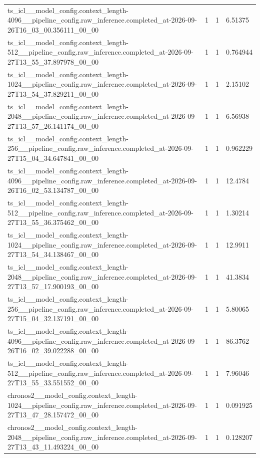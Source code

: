 \begin{tabular}{llll}
ts\_icl\_\_model\_config.context\_length-4096\_\_pipeline\_config.raw\_inference.completed\_at-2026-09-26T16\_03\_00.356111\_00\_00 & 1 & 1 & 6.51375 \\
ts\_icl\_\_model\_config.context\_length-512\_\_pipeline\_config.raw\_inference.completed\_at-2026-09-27T13\_55\_37.897978\_00\_00 & 1 & 1 & 0.764944 \\
ts\_icl\_\_model\_config.context\_length-1024\_\_pipeline\_config.raw\_inference.completed\_at-2026-09-27T13\_54\_37.829211\_00\_00 & 1 & 1 & 2.15102 \\
ts\_icl\_\_model\_config.context\_length-2048\_\_pipeline\_config.raw\_inference.completed\_at-2026-09-27T13\_57\_26.141174\_00\_00 & 1 & 1 & 6.56938 \\
ts\_icl\_\_model\_config.context\_length-256\_\_pipeline\_config.raw\_inference.completed\_at-2026-09-27T15\_04\_34.647841\_00\_00 & 1 & 1 & 0.962229 \\
ts\_icl\_\_model\_config.context\_length-4096\_\_pipeline\_config.raw\_inference.completed\_at-2026-09-26T16\_02\_53.134787\_00\_00 & 1 & 1 & 12.4784 \\
ts\_icl\_\_model\_config.context\_length-512\_\_pipeline\_config.raw\_inference.completed\_at-2026-09-27T13\_55\_36.375462\_00\_00 & 1 & 1 & 1.30214 \\
ts\_icl\_\_model\_config.context\_length-1024\_\_pipeline\_config.raw\_inference.completed\_at-2026-09-27T13\_54\_34.138467\_00\_00 & 1 & 1 & 12.9911 \\
ts\_icl\_\_model\_config.context\_length-2048\_\_pipeline\_config.raw\_inference.completed\_at-2026-09-27T13\_57\_17.900193\_00\_00 & 1 & 1 & 41.3834 \\
ts\_icl\_\_model\_config.context\_length-256\_\_pipeline\_config.raw\_inference.completed\_at-2026-09-27T15\_04\_32.137191\_00\_00 & 1 & 1 & 5.80065 \\
ts\_icl\_\_model\_config.context\_length-4096\_\_pipeline\_config.raw\_inference.completed\_at-2026-09-26T16\_02\_39.022288\_00\_00 & 1 & 1 & 86.3762 \\
ts\_icl\_\_model\_config.context\_length-512\_\_pipeline\_config.raw\_inference.completed\_at-2026-09-27T13\_55\_33.551552\_00\_00 & 1 & 1 & 7.96046 \\
chronos2\_\_model\_config.context\_length-1024\_\_pipeline\_config.raw\_inference.completed\_at-2026-09-27T13\_47\_28.157472\_00\_00 & 1 & 1 & 0.091925 \\
chronos2\_\_model\_config.context\_length-2048\_\_pipeline\_config.raw\_inference.completed\_at-2026-09-27T13\_43\_11.493224\_00\_00 & 1 & 1 & 0.128207 \\

\end{tabular}
